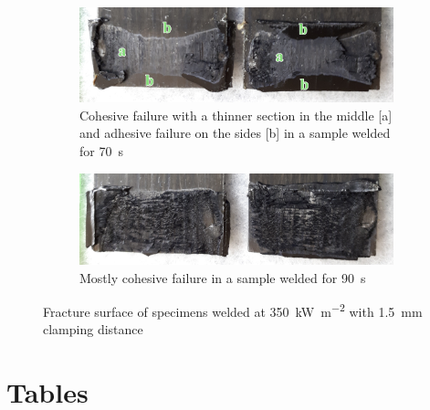 \documentclass[11pt,review,times]{elsarticle}
\begin{document}
\begin{figure}[htb]
	\center
	\captionsetup{width=125mm}
	\begin{subfigure}{125mm}
		\center
		\captionsetup{width=125mm}
		\includegraphics[width=125mm]{Fig4a.jpg}
		\caption{Cohesive failure with a thinner section in the middle [a] and adhesive failure on the sides [b] in a sample welded for \SI{70}{\s}}
		\label{fig:fracture_surface_70s}
	\end{subfigure}
	\begin{subfigure}{125mm}
		\center
		\captionsetup{width=125mm}
		\includegraphics[width=125mm]{Fig4b.jpg}
		\caption{Mostly cohesive failure in a sample welded for \SI{90}{\s}}
		\label{fig:fracture_surface_90s}
	\end{subfigure}%
	\caption{Fracture surface of specimens welded at \SI{350}{\kW\per\square\metre} with \SI{1.5}{\mm} clamping distance \cite{Brassard2018_figshare_article1}}
	\label{fig:fracture_surface}
\end{figure}

\FloatBarrier
\clearpage
							\section*{Tables}
\FloatBarrier
\end{document}
